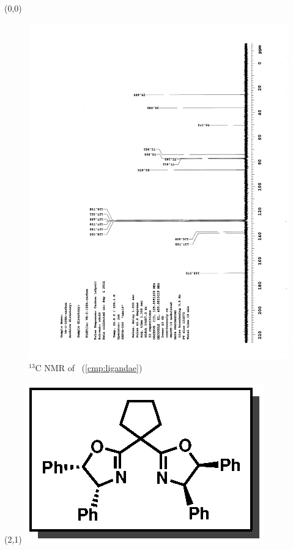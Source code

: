 \clearpage
\begin{textblock}{20}(0,0)
\begin{figure}[htb]
\caption{$^{13}$C NMR of  \CMPligandae\ (\ref{cmp:ligandae})}
\includegraphics[scale=0.75, trim = 0mm 0mm 0mm 5mm,
clip]{chp_asymmetric/images/nmr/ligandaeC}
\vspace{-100pt}
\end{figure}
\end{textblock}
\begin{textblock}{1}(2,1)
\includegraphics[scale=0.8, angle=90]{chp_asymmetric/images/ligandae}
\end{textblock}
\clearpage

